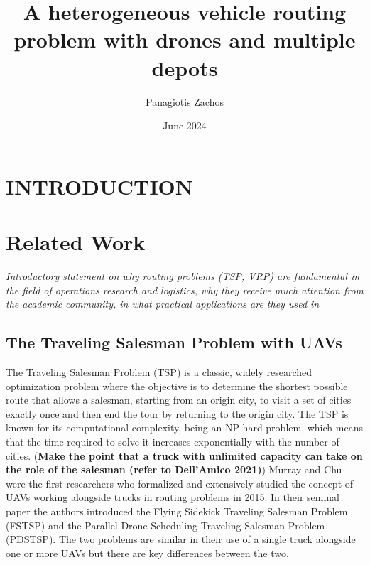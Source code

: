 \documentclass{article}
\title{A heterogeneous vehicle routing problem with drones and multiple depots}
\author{Panagiotis Zachos}
\date{June 2024}
\begin{document}
	\maketitle
	\section{INTRODUCTION}
	
	
	\section{Related Work}
	\textit{Introductory statement on why routing problems (TSP, VRP) are fundamental in the field of operations research and logistics, why they receive much attention from the academic community, in what practical applications are they used in}
	
	\subsection{The Traveling Salesman Problem with UAVs}
	The Traveling Salesman Problem (TSP) is a classic, widely researched optimization problem where the objective is to determine the shortest possible route that allows a salesman, starting from an origin city, to visit a set of cities exactly once and then end the tour by returning to the origin city. The TSP is known for its computational complexity, being an NP-hard problem, which means that the time required to solve it increases exponentially with the number of cities.
	(\textbf{Make the point that a truck with unlimited capacity can take on the role of the salesman (refer to Dell'Amico 2021)}) 
	Murray and Chu were the first researchers who formalized and extensively studied the concept of UAVs working alongside trucks in routing problems in 2015. In their seminal paper \cite{Murray2015} the authors introduced the Flying Sidekick Traveling Salesman Problem (FSTSP) and the Parallel Drone Scheduling Traveling Salesman Problem (PDSTSP). The two problems are similar in their use of a single truck alongside one or more UAVs but there are key differences between the two. 
	
\end{document}
